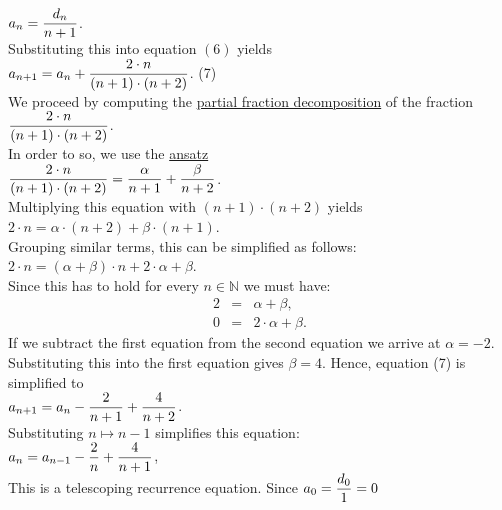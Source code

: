 \hspace*{1.3cm}
$\displaystyle a_n = \frac{d_n}{n+1}$. 
\\[0.2cm] 
Substituting this into equation $(6)$ yields
\\[0.2cm]
\hspace*{1.3cm}
$\displaystyle a_{n+1} = a_{n} + \frac{2\cdot n}{(n+1)\cdot(n+2)}$.  \hspace*{\fill} (7)
\\[0.2cm]
We proceed by computing the 
\href{http://en.wikipedia.org/wiki/Partial_fraction}{partial fraction decomposition}
of the fraction
\\[0.2cm]
\hspace*{1.3cm}
$\displaystyle\frac{2\cdot n}{(n+1)\cdot(n+2)}$.
\\[0.2cm] 
In order to so, we use the \href{http://en.wikipedia.org/wiki/Ansatz}{ansatz}
\\[0.2cm]
\hspace*{1.3cm}
$\displaystyle\frac{2\cdot n}{(n+1)\cdot(n+2)} = \frac{\alpha}{n+1} + \frac{\beta}{n+2}$.
\\[0.2cm] 
Multiplying this equation with $(n+1) \cdot (n+2)$ yields
\\[0.2cm]
\hspace*{1.3cm}
$ 2\cdot n = \alpha \cdot (n+2) + \beta \cdot (n+1)$.
\\[0.2cm]
Grouping similar terms, this can be simplified as follows:
\\[0.2cm]
\hspace*{1.3cm}
$2\cdot n = (\alpha + \beta) \cdot n + 2 \cdot \alpha  + \beta$.
\\[0.2cm]
Since this has to hold for every $n \in \mathbb{N}$ we must have:
\begin{eqnarray*}
  2 & = & \alpha + \beta, \\
  0 & = & 2 \cdot \alpha + \beta.
\end{eqnarray*}
If we subtract the first equation from the second equation we arrive at
 $\alpha = -2$.  Substituting this into the first equation gives $\beta = 4$.
Hence,  equation (7) is simplified to
\\[0.2cm]
\hspace*{1.3cm}
$\displaystyle a_{n+1} = a_{n} - \frac{2}{n+1} + \frac{4}{n+2}$.
\\[0.2cm] 
Substituting $n \mapsto n-1$ simplifies this equation: 
\\[0.2cm]
\hspace*{1.3cm}
$\displaystyle a_{n} = a_{n-1} - \frac{2}{n} + \frac{4}{n+1}$,
\\[0.2cm] 
This is a telescoping recurrence equation.  Since $a_0 = \displaystyle\frac{d_0}{1} = 0$
